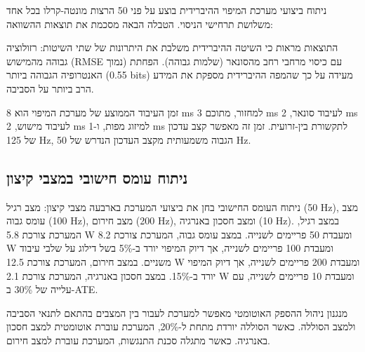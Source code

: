 ניתוח ביצועי מערכת המיפוי ההיברידית בוצע על פני 50 הרצות מונטה-קרלו בכל אחד משלושת תרחישי הניסוי. הטבלה הבאה מסכמת את תוצאות ההשוואה:

\begin{table}[htbp]
\centering
\caption{מדדי דיוק מיפוי השוואתיים: RMSE, שלמות, הפחתת אנטרופיה וקצב עדכון.}
\label{tab:ch07_mapping_metrics}
\end{table}

התוצאות מראות כי השיטה ההיברידית משלבת את היתרונות של שתי השיטות: רזולוציה גבוהה מהמישוש (RMSE נמוך) עם כיסוי מרחבי רחב מהסונאר (שלמות גבוהה). הפחתת האנטרופיה הגבוהה ביותר (0.55 bits) מעידה על כך שהמפה ההיברידית מספקת את המידע הרב ביותר על הסביבה.

זמן העיבוד הממוצע של מערכת המיפוי הוא 8 ms למחזור, מתוכם 3 ms לעיבוד סונאר, 2 ms לעיבוד מישוש, 2 ms למיזוג מפות, ו-1 ms לתקשורת בין-זרועית. זמן זה מאפשר קצב עדכון של 125 Hz, הגבוה משמעותית מקצב העדכון הנדרש של 50 Hz.

\subsection{ניתוח עומס חישובי במצבי קיצון}
\label{sec:ch07_computational_load}

ניתוח העומס החישובי בחן את ביצועי המערכת בארבעה מצבי קיצון: מצב רגיל (50 Hz), מצב עומס גבוה (100 Hz), מצב חירום (200 Hz), ומצב חסכון באנרגיה (10 Hz). במצב רגיל, המערכת צורכת 5.8 W ומעבדת 50 פריימים לשנייה. במצב עומס גבוה, המערכת צורכת 8.2 W ומעבדת 100 פריימים לשנייה, אך דיוק המיפוי יורד ב-5\% בשל דילוג על שלבי עיבוד משניים. במצב חירום, המערכת צורכת 12.5 W ומעבדת 200 פריימים לשנייה, אך דיוק המיפוי יורד ב-15\%. במצב חסכון באנרגיה, המערכת צורכת 2.1 W ומעבדת 10 פריימים לשנייה, עם עלייה של 30\% ב-ATE.

מנגנון ניהול ההספק האוטומטי מאפשר למערכת לעבור בין המצבים בהתאם לתנאי הסביבה ולמצב הסוללה. כאשר הסוללה יורדת מתחת ל-20\%, המערכת עוברת אוטומטית למצב חסכון באנרגיה. כאשר מתגלה סכנת התנגשות, המערכת עוברת למצב חירום.

